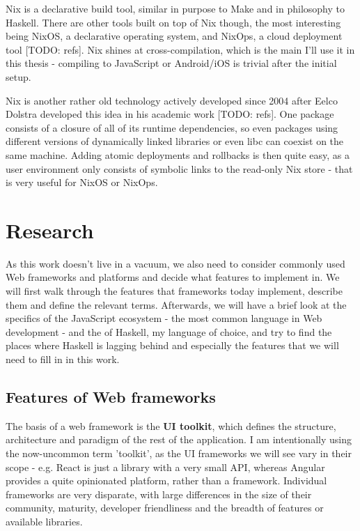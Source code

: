 \documentclass[english,odsaz]{fitthesis}
\begin{document}
Nix is a declarative build tool, similar in purpose to Make and in philosophy to
Haskell. There are other tools built on top of Nix though, the most interesting
being NixOS, a declarative operating system, and NixOps, a cloud deployment tool
[TODO: refs]. Nix shines at cross-compilation, which is the main I'll use it in
this thesis - compiling to JavaScript or Android/iOS is trivial after the
initial setup.

Nix is another rather old technology actively developed since 2004 after Eelco
Dolstra developed this idea in his academic work [TODO: refs]. One package
consists of a closure of all of its runtime dependencies, so even packages using
different versions of dynamically linked libraries or even libc can coexist on
the same machine. Adding atomic deployments and rollbacks is then quite easy, as
a user environment only consists of symbolic links to the read-only Nix store -
that is very useful for NixOS or NixOps.

\chapter{Research}
\label{sec:org3b6e464}
As this work doesn't live in a vacuum, we also need to consider commonly used
Web frameworks and platforms and decide what features to implement in. We will
first walk through the features that frameworks today implement, describe them
and define the relevant terms. Afterwards, we will have a brief look at the
specifics of the JavaScript ecosystem - the most common language in Web
development - and the of Haskell, my language of choice, and try to find the
places where Haskell is lagging behind and especially the features that we will
need to fill in in this work.

\section{Features of Web frameworks}
\label{sec:org0f24458}
The basis of a web framework is the \textbf{UI toolkit}, which defines the structure,
architecture and paradigm of the rest of the application. I am intentionally
using the now-uncommon term 'toolkit', as the UI frameworks we will see vary in
their scope - e.g. React is just a library with a very small API, whereas
Angular provides a quite opinionated platform, rather than a
framework. Individual frameworks are very disparate, with large differences in
the size of their community, maturity, developer friendliness and the breadth of
features or available libraries.
\end{document}
